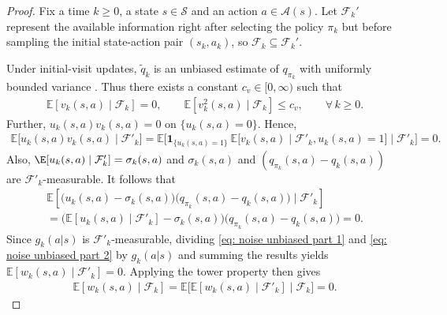 \begin{proof}
Fix a time $k\ge 0$, a state $s \in \mathcal S$ and an action $a \in \mathcal A(s)$.
Let $\mathcal F_k'$ represent the available information right after selecting the policy $\pi_k$ but before sampling the initial state-action pair $(s_k, a_k)$, so $\mathcal F_k \subseteq \mathcal F_k'$.

Under initial-visit updates, $\tilde q_k$ is an unbiased estimate of $q_{\pi_k}$ with uniformly bounded variance
\cite{Singh1996ReinforcementTraces}.
Thus there exists a constant $c_v \in [0,\infty)$ such that
\begin{align}
\label{eq: properties episode noise}
\mathbb E\!\left[v_k(s,a) \mid \mathcal F_k \right] = 0 ,
\qquad
\mathbb E\!\left[v_k^2(s,a) \mid \mathcal F_k \right] \le c_v,
\qquad
\forall \, k \ge 0 .
\end{align}
Further, 
$u_k(s,a) v_k(s,a) = 0$ on $\{u_k(s,a)=0\}$.
Hence,
\begin{align}
\label{eq: noise unbiased part 1}
\mathbb E\big[ u_k(s,a) v_k(s,a) \mid \mathcal F'_k \big]
=
\mathbb E \Big[ 
    \mathbf{1}_{\{u_k(s,a)=1\}} \ 
    \mathbb E \big[ v_k(s,a) \mid \mathcal F'_k, u_k(s,a) = 1 \big]
    \mid \mathcal F'_k \Big]
    = 0 .
\end{align}
Also,
$\E[u_k(s,a) \mid \mathcal F'_k] = \sigma_k(s,a)$ 
and
$\sigma_k(s,a)$ and $(q_{\pi_k}(s,a)-q_k(s,a))$ are $\mathcal F'_k$-measurable. It follows that
\begin{multline}
\mathbb E \!\left[ 
\big( u_k(s,a) - \sigma_k(s,a) \big) \big( q_{\pi_k}(s,a) - q_k(s,a) \big)
\mid \mathcal F'_k
\right]
\\
\label{eq: noise unbiased part 2}
=
\big(
\mathbb E [ u_k(s,a) \mid \mathcal F'_k ]
- \sigma_k(s,a)
\big)
\big( q_{\pi_k}(s,a)-q_k(s,a) \big)
=
0 .
\end{multline}
Since $g_k(a | s)$ is $\mathcal F'_k$-measurable,
dividing \eqref{eq: noise unbiased part 1} and \eqref{eq: noise unbiased part 2} by $g_k(a | s)$ and summing the results yields $\mathbb E[w_k(s,a) \mid \mathcal F'_k] = 0$.
Applying the tower property then gives
\begin{align}
\label{eq: noise is unbiased}
\mathbb E [ w_k(s,a) \mid \mathcal F_k ]
= \mathbb E \big[ \mathbb E [ w_k(s,a) \mid \mathcal F'_k] \mid \mathcal F_k \big]
= 0 .
\end{align}


\end{proof}
